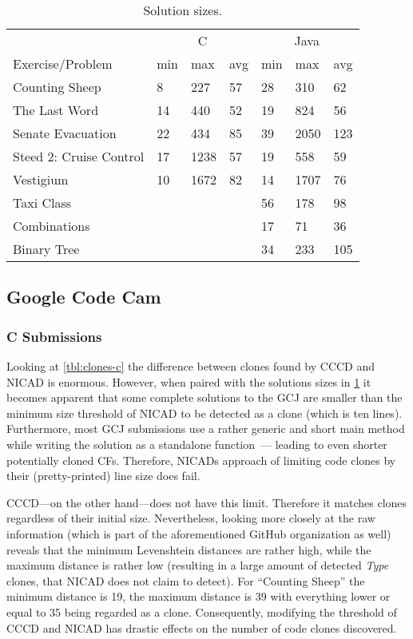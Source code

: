 \documentclass[10pt,journal,compsoc]{IEEEtran}
\def\T#1{\textsl{Type\nobreakdash-#1}}
\begin{document}
\begin{table}
  \centering\begin{tabular}{l lll lll}
    \toprule
                            & \multicolumn{3}{c}{C} & \multicolumn{3}{c}{Java} \\
    \cmidrule(r){2-4}\cmidrule{5-7}
    Exercise/Problem        & min & max & avg & min & max & avg\\
    \midrule
    Counting Sheep          &  8 & 227 & 57 & 28 & 310 & 62\\
    The Last Word           &  14 &440 & 52 &  19 & 824 & 56 \\
    Senate Evacuation       &  22 & 434 & 85 & 39 & 2050 & 123\\
    Steed 2: Cruise Control & 17& 1238 & 57  & 19& 558 & 59\\
    Vestigium               &  10&  1672 & 82&  14& 1707  & 76 \\
    \midrule
    Taxi Class & & & & 56 & 178 & 98 \\
    Combinations & & & & 17 & 71 & 36 \\
    Binary Tree & & & & 34 & 233 & 105 \\
    \bottomrule
  \end{tabular}\medskip
  \caption{Solution sizes.}
  \label{tbl:file-sizes}
\end{table}


\subsection{Google Code Cam}
\subsubsection{C Submissions}
Looking at \cref{tbl:clones-c} the difference between clones found by CCCD and NICAD is enormous.
However, when paired with the solutions sizes in \cref{tbl:file-sizes} it becomes apparent that some complete solutions to the GCJ are smaller than the minimum size threshold of NICAD to be detected as a clone (which is ten lines).
Furthermore, most GCJ submissions use a rather generic and short main method while writing the solution as a standalone function~--- leading to even shorter potentially cloned CFs.
Therefore, NICADs approach of limiting code clones by their (pretty-printed) line size does fail.

CCCD---on the other hand---does not have this limit. Therefore it matches clones regardless of their initial size.
Nevertheless, looking more closely at the raw information (which is part of the aforementioned GitHub organization as well) reveals that the minimum Levenshtein distances are rather high, while the maximum distance is rather low (resulting in a large amount of detected \T4 clones, that NICAD does not claim to detect).
For \enquote{Counting Sheep} the minimum distance is \num{19}, the maximum distance is \num{39} with everything lower or equal to \num{35} being regarded as a clone.
Consequently, modifying the threshold of CCCD and NICAD has drastic effects on the number of code clones discovered.
\end{document}
